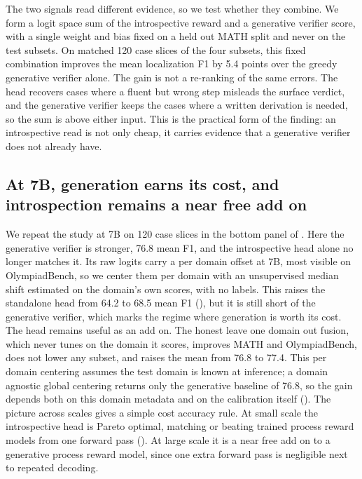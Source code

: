 The two signals read different evidence, so we test whether they combine. We form a logit space sum of the introspective reward and a generative verifier score, with a single weight and bias fixed on a held out MATH split and never on the test subsets. On matched 120 case slices of the four subsets, this fixed combination improves the mean localization F1 by 5.4 points over the greedy generative verifier alone. The gain is not a re-ranking of the same errors. The head recovers cases where a fluent but wrong step misleads the surface verdict, and the generative verifier keeps the cases where a written derivation is needed, so the sum is above either input. This is the practical form of the finding: an introspective read is not only cheap, it carries evidence that a generative verifier does not already have.

\subsection{At 7B, generation earns its cost, and introspection remains a near free add on}
\label{sec:exp-7b}

We repeat the study at 7B on 120 case slices in the bottom panel of . Here the generative verifier is stronger, 76.8 mean F1, and the introspective head alone no longer matches it. Its raw logits carry a per domain offset at 7B, most visible on OlympiadBench, so we center them per domain with an unsupervised median shift estimated on the domain's own scores, with no labels. This raises the standalone head from 64.2 to 68.5 mean F1 (), but it is still short of the generative verifier, which marks the regime where generation is worth its cost. The head remains useful as an add on. The honest leave one domain out fusion, which never tunes on the domain it scores, improves MATH and OlympiadBench, does not lower any subset, and raises the mean from 76.8 to 77.4. This per domain centering assumes the test domain is known at inference; a domain agnostic global centering returns only the generative baseline of 76.8, so the gain depends both on this domain metadata and on the calibration itself (). The picture across scales gives a simple cost accuracy rule. At small scale the introspective head is Pareto optimal, matching or beating trained process reward models from one forward pass (). At large scale it is a near free add on to a generative process reward model, since one extra forward pass is negligible next to repeated decoding.

